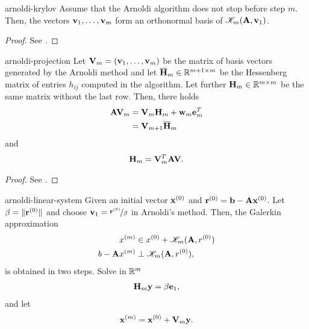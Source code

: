 \begin{Lemma}{arnoldi-krylov}
  Assume that the Arnoldi algorithm does not stop before step
  $m$. Then, the vectors $\mathbf v_1,\dots,\mathbf v_m$ form an orthonormal basis
  of $\mathscr K_m(\mathbf A,\mathbf v_1)$.
\end{Lemma}

\begin{proof}
  See \cite[Proposition 6.4]{Saad00}.
\end{proof}

\begin{Theorem}{arnoldi-projection}
  Let $\mathbf V_m = (\mathbf v_1,\dots,\mathbf v_m)$ be the matrix of basis vectors
  generated by the Arnoldi method and let
  $\overline{\mathbf H}_m\in\mathbb R^{m+1\times m}$ be the Hessenberg matrix of
  entries $h_{ij}$ computed in the algorithm. Let further
  $\mathbf H_m\in\mathbb R^{m\times m}$ be the same matrix without the last
  row. Then, there holds
  \begin{align}
    \mathbf A\mathbf V_m &= \mathbf V_m\mathbf H_m+\mathbf w_m\mathbf e_m^T\\
                 &= \mathbf V_{m+1}\overline{\mathbf H}_m\\
  \end{align}
  and
  \begin{gather}
    \mathbf H_m = \mathbf V_m^T\mathbf A\mathbf V.
  \end{gather}
\end{Theorem}

\begin{proof}
  See \cite[Proposition 6.5]{Saad00}.
\end{proof}

\begin{Theorem}{arnoldi-linear-system}
  Given an initial vector $\mathbf x^{(0)}$ and
  $\mathbf r^{(0)} = \mathbf b - \mathbf A \mathbf x^{(0)}$. Let $\beta=\lVert\mathbf r^{(0)}\rVert$
  and choose $\mathbf v_1 =\nicefrac{\mathbf r^{(0)}}{\beta}$ in Arnoldi's
  method. Then, the Galerkin approximation
  \begin{align}
    x^{(m)} &\in x^{(0)} + \mathscr K_m(\mathbf A,r^{(0)})\\
    b-\mathbf A x^{(m)} &\perp \mathscr K_m(\mathbf A,r^{(0)}),
  \end{align}
  is obtained in two steps. Solve in $\mathbb R^m$
  \begin{gather}
    \mathbf H_m\mathbf y = \beta\mathbf e_1,
  \end{gather}
  and let
  \begin{gather}
    \mathbf x^{(m)} = \mathbf x^{(0)} + \mathbf V_m \mathbf y.
  \end{gather}
\end{Theorem}

